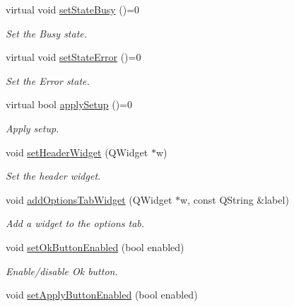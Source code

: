 \begin{DoxyCompactItemize}
virtual void \hyperlink{classmdt_abstract_port_setup_dialog_ae69fe60533e2df56f790e2522bb81592}{setStateBusy} ()=0
\begin{DoxyCompactList}\small\item\em Set the Busy state. \end{DoxyCompactList}\item 
virtual void \hyperlink{classmdt_abstract_port_setup_dialog_a7cd081326d0935ea06d617b821795bb9}{setStateError} ()=0
\begin{DoxyCompactList}\small\item\em Set the Error state. \end{DoxyCompactList}\item 
virtual bool \hyperlink{classmdt_abstract_port_setup_dialog_ab090cd4da49eb9f2f1fc2f507bdb9717}{applySetup} ()=0
\begin{DoxyCompactList}\small\item\em Apply setup. \end{DoxyCompactList}\item 
void \hyperlink{classmdt_abstract_port_setup_dialog_ab01700b5a09fc1b6c5f6f62e77148b43}{setHeaderWidget} (QWidget $\ast$w)
\begin{DoxyCompactList}\small\item\em Set the header widget. \end{DoxyCompactList}\item 
void \hyperlink{classmdt_abstract_port_setup_dialog_ad21fb0a1f6f2c175d12fa066c4f3f5a9}{addOptionsTabWidget} (QWidget $\ast$w, const QString \&label)
\begin{DoxyCompactList}\small\item\em Add a widget to the options tab. \end{DoxyCompactList}\item 
\hypertarget{classmdt_abstract_port_setup_dialog_a19f18be7722d2437dbab87b7a568b216}{
void \hyperlink{classmdt_abstract_port_setup_dialog_a19f18be7722d2437dbab87b7a568b216}{setOkButtonEnabled} (bool enabled)}
\label{classmdt_abstract_port_setup_dialog_a19f18be7722d2437dbab87b7a568b216}

\begin{DoxyCompactList}\small\item\em Enable/disable Ok button. \end{DoxyCompactList}\item 
\hypertarget{classmdt_abstract_port_setup_dialog_a4fa65cf9827a81bf501008ced33b69ab}{
void \hyperlink{classmdt_abstract_port_setup_dialog_a4fa65cf9827a81bf501008ced33b69ab}{setApplyButtonEnabled} (bool enabled)}
\label{classmdt_abstract_port_setup_dialog_a4fa65cf9827a81bf501008ced33b69ab}


\end{DoxyCompactItemize}
